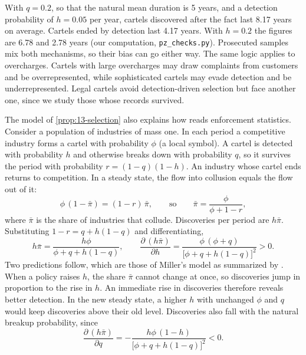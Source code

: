 With $q = 0.2$, so that the natural mean duration is 5 years, and a detection probability of $h = 0.05$ per year,
cartels discovered after the fact last 8.17 years on average. Cartels ended by detection last 4.17 years. With
$h = 0.2$ the figures are 6.78 and 2.78 years (our computation, \texttt{pz\_checks.py}). Prosecuted samples mix both
mechanisms, so their bias can go either way. The same logic applies to overcharges. Cartels with large overcharges
may draw complaints from customers and be overrepresented, while sophisticated cartels may evade detection and be
underrepresented. Legal cartels avoid detection-driven selection but face another one, since we study those whose
records survived.

\begin{remark}\label{rem:13-miller}
The model of \cref{prop:13-selection} also explains how \citet{Miller2009} reads enforcement statistics. Consider a
population of industries of mass one. In each period a competitive industry forms a cartel with probability $\phi$
(a local symbol). A cartel is detected with probability $h$ and otherwise breaks down with probability $q$, so it
survives the period with probability $r = (1-q)(1-h)$. An industry whose cartel ends returns to competition. In a
steady state, the flow into collusion equals the flow out of it:
\begin{equation*}
  \phi\,(1 - \bar\pi) = (1 - r)\,\bar\pi , \qquad \text{so} \qquad \bar\pi = \frac{\phi}{\phi + 1 - r} ,
\end{equation*}
where $\bar\pi$ is the share of industries that collude. Discoveries per period are $h\bar\pi$. Substituting
$1 - r = q + h(1 - q)$ and differentiating,
\begin{equation*}
  h\bar\pi = \frac{h\phi}{\phi + q + h(1 - q)} , \qquad
  \frac{\partial\,(h\bar\pi)}{\partial h} = \frac{\phi\,(\phi + q)}{\bigl[\phi + q + h(1 - q)\bigr]^{2}} > 0 .
\end{equation*}
Two predictions follow, which are those of Miller's model as summarized by \citet[p.~186]{AskerNocke2021}. When a
policy raises $h$, the share $\bar\pi$ cannot change at once, so discoveries jump in proportion to the rise in $h$.
An immediate rise in discoveries therefore reveals better detection. In the new steady state, a higher $h$ with
unchanged $\phi$ and $q$ would keep discoveries above their old level. Discoveries also fall with the natural
breakup probability, since
\begin{equation*}
  \frac{\partial\,(h\bar\pi)}{\partial q} = -\frac{h\phi\,(1 - h)}{\bigl[\phi + q + h(1 - q)\bigr]^{2}} < 0 .

\end{equation*}
\end{remark}
